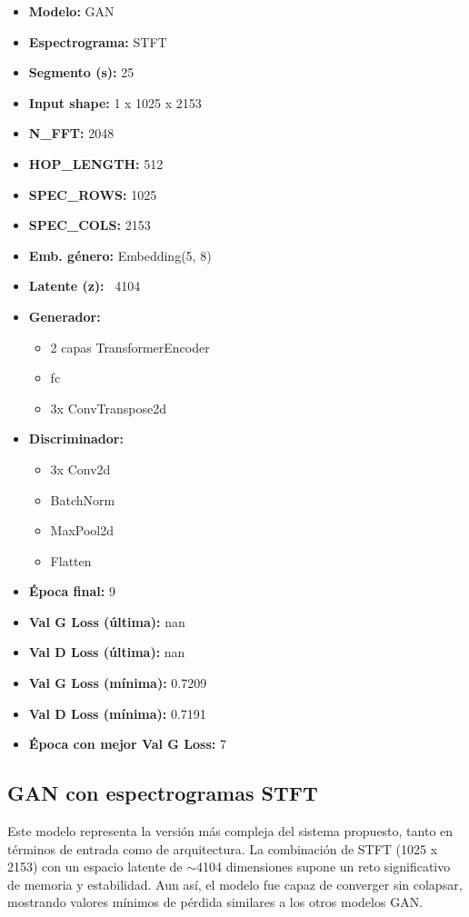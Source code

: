\begin{itemize}
  \item \textbf{Modelo:} GAN
  \item \textbf{Espectrograma:} STFT
  \item \textbf{Segmento (s):} 25
  \item \textbf{Input shape:} 1 x 1025 x 2153
  \item \textbf{N\_FFT:} 2048
  \item \textbf{HOP\_LENGTH:} 512
  \item \textbf{SPEC\_ROWS:} 1025
  \item \textbf{SPEC\_COLS:} 2153
  \item \textbf{Emb. género:} Embedding(5, 8)
  \item \textbf{Latente (z):} ~4104
  \item \textbf{Generador:}
  \begin{itemize}
    \item 2 capas TransformerEncoder
    \item fc
    \item 3x ConvTranspose2d
  \end{itemize}
  \item \textbf{Discriminador:}
  \begin{itemize}
    \item 3x Conv2d
    \item BatchNorm
    \item MaxPool2d
    \item Flatten
  \end{itemize}
  \item \textbf{Época final:} 9
  \item \textbf{Val G Loss (última):} nan
  \item \textbf{Val D Loss (última):} nan
  \item \textbf{Val G Loss (mínima):} 0.7209
  \item \textbf{Val D Loss (mínima):} 0.7191
  \item \textbf{Época con mejor Val G Loss:} 7
\end{itemize}

\subsection{GAN con espectrogramas STFT}

Este modelo representa la versión más compleja del sistema propuesto, tanto en términos de entrada como de arquitectura. La combinación de STFT (1025 x 2153) con un espacio latente de $\sim$4104 dimensiones supone un reto significativo de memoria y estabilidad. Aun así, el modelo fue capaz de converger sin colapsar, mostrando valores mínimos de pérdida similares a los otros modelos GAN.

